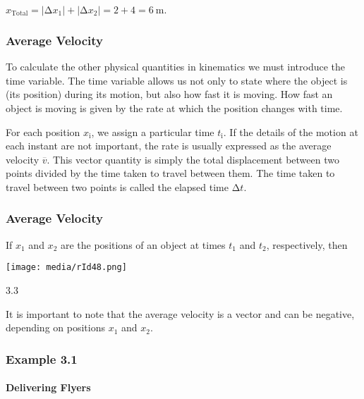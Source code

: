 \(x_{\mathrm{\text{Total}}} = \left| \mathrm{\Delta}x_{1} \right| + \left| \mathrm{\Delta}x_{2} \right| = 2 + 4 = 6\ \mathrm{m}\mathrm{.}\)

\hypertarget{average-velocity}{%
\subsubsection{Average Velocity}\label{average-velocity}}

To calculate the other physical quantities in kinematics we must
introduce the time variable. The time variable allows us not only to
state where the object is (its position) during its motion, but also how
fast it is moving. How fast an object is moving is given by the rate at
which the position changes with time.

For each position \(x_{\mathrm{i}}\), we assign a particular time
\(t_{\mathrm{i}}\). If the details of the motion at each instant are not
important, the rate is usually expressed as the average velocity
\(\overset{\mathrm{–}}{v}\). This vector quantity is simply the total
displacement between two points divided by the time taken to travel
between them. The time taken to travel between two points is called the
elapsed time \(\mathrm{\Delta}t\).

\hypertarget{average-velocity-1}{%
\subsubsection{Average Velocity}\label{average-velocity-1}}

If \(x_{1}\) and \(x_{2}\) are the positions of an object at times
\(t_{1}\) and \(t_{2}\), respectively, then

\texttt{[image: media/rId48.png]}

3.3

It is important to note that the average velocity is a vector and can be
negative, depending on positions \(x_{1}\) and \(x_{2}\).

\hypertarget{example-3.1}{%
\subsubsection{Example 3.1 }\label{example-3.1}}

\hypertarget{delivering-flyers}{%
\paragraph{Delivering Flyers}\label{delivering-flyers}}

